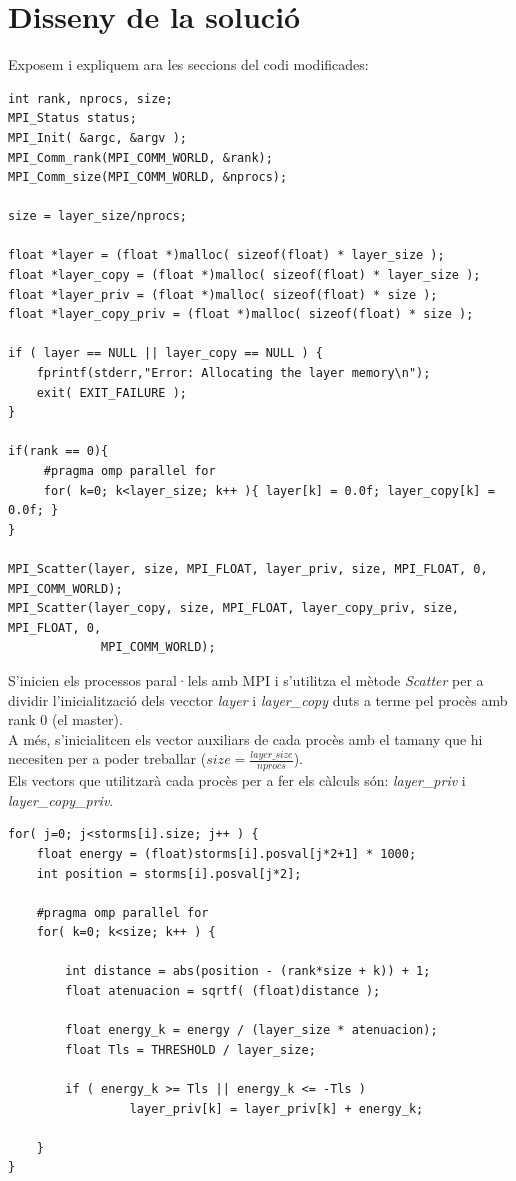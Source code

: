 \documentclass[a4paper, 11pt]{article}
\begin{document}
\section{Disseny de la solució}
Exposem i expliquem ara les seccions del codi modificades:
\begin{lstlisting}[language = GERONA, firstnumber = 172]
int rank, nprocs, size;
MPI_Status status;
MPI_Init( &argc, &argv );
MPI_Comm_rank(MPI_COMM_WORLD, &rank);
MPI_Comm_size(MPI_COMM_WORLD, &nprocs);

size = layer_size/nprocs;

float *layer = (float *)malloc( sizeof(float) * layer_size );
float *layer_copy = (float *)malloc( sizeof(float) * layer_size );
float *layer_priv = (float *)malloc( sizeof(float) * size );
float *layer_copy_priv = (float *)malloc( sizeof(float) * size );

if ( layer == NULL || layer_copy == NULL ) {
    fprintf(stderr,"Error: Allocating the layer memory\n");
    exit( EXIT_FAILURE );
}

if(rank == 0){
     #pragma omp parallel for
     for( k=0; k<layer_size; k++ ){ layer[k] = 0.0f; layer_copy[k] = 0.0f; }
}

MPI_Scatter(layer, size, MPI_FLOAT, layer_priv, size, MPI_FLOAT, 0, MPI_COMM_WORLD);
MPI_Scatter(layer_copy, size, MPI_FLOAT, layer_copy_priv, size, MPI_FLOAT, 0, 
             MPI_COMM_WORLD);
\end{lstlisting}
\vspace{2em}
S'inicien els processos paral·lels amb MPI i s'utilitza el mètode \textit{Scatter} per a dividir l'inicialització dels vecctor \textit{layer} i \textit{layer\_copy} duts a terme pel procès amb rank 0 (el master).\\
A més, s'inicialitcen els vector auxiliars de cada procès amb el tamany que hi necesiten per a poder treballar ($size = \frac{layer\_size}{nprocs}$).\\
Els vectors que utilitzarà cada procès per a fer els càlculs són: \textit{layer\_priv} i \textit{layer\_copy\_priv}.
\newpage
\begin{lstlisting}[language = GERONA, firstnumber = 209]
for( j=0; j<storms[i].size; j++ ) {
    float energy = (float)storms[i].posval[j*2+1] * 1000;
    int position = storms[i].posval[j*2];

    #pragma omp parallel for
    for( k=0; k<size; k++ ) {

        int distance = abs(position - (rank*size + k)) + 1;
        float atenuacion = sqrtf( (float)distance );

        float energy_k = energy / (layer_size * atenuacion);
        float Tls = THRESHOLD / layer_size;

        if ( energy_k >= Tls || energy_k <= -Tls )
                 layer_priv[k] = layer_priv[k] + energy_k;

    }
}
\end{lstlisting}
\end{document}
